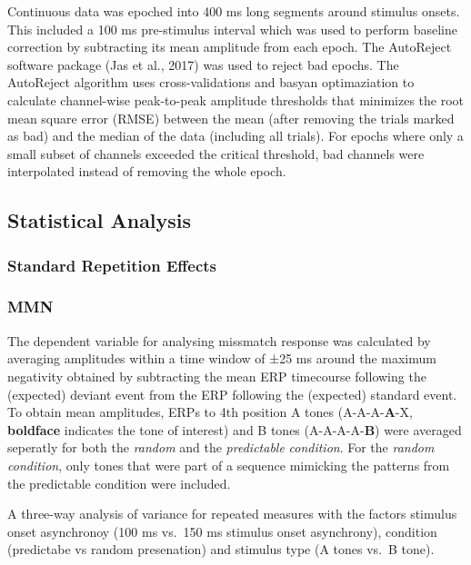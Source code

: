 \documentclass[stu,a4paper,11pt,floatsintext]{apa7}
\begin{document}
Continuous data was epoched into 400 ms long segments around stimulus
onsets. This included a 100 ms pre-stimulus interval which was used to
perform baseline correction by subtracting its mean amplitude from each
epoch. The AutoReject software package (Jas et al., 2017) was used to
reject bad epochs. The AutoReject algorithm uses cross-validations and
basyan optimaziation to calculate channel-wise peak-to-peak amplitude
thresholds that minimizes the root mean square error (RMSE) between the
mean (after removing the trials marked as bad) and the median of the
data (including all trials). For epochs where only a small subset of
channels exceeded the critical threshold, bad channels were interpolated
instead of removing the whole epoch.

\hypertarget{statistical-analysis}{%
\subsection{Statistical Analysis}\label{statistical-analysis}}

\hypertarget{standard-repetition-effects}{%
\subsubsection{Standard Repetition
Effects}\label{standard-repetition-effects}}

\hypertarget{mmn}{%
\subsubsection{MMN}\label{mmn}}

The dependent variable for analysing missmatch response was calculated
by averaging amplitudes within a time window of ±25 ms around the
maximum negativity obtained by subtracting the mean ERP timecourse
following the (expected) deviant event from the ERP following the
(expected) standard event. To obtain mean amplitudes, ERPs to 4th
position A tones (A-A-A-\textbf{A}-X, \textbf{boldface} indicates the
tone of interest) and B tones (A-A-A-A-\textbf{B}) were averaged
seperatly for both the \emph{random} and the \emph{predictable}
\emph{condition}. For the \emph{random condition}, only tones that were
part of a sequence mimicking the patterns from the predictable condition
were included.

A three-way analysis of variance for repeated measures with the factors
stimulus onset asynchronoy (100 ms vs.~150 ms stimulus onset
asynchrony), condition (predictabe vs random presenation) and stimulus
type (A tones vs.~B tone).
\end{document}

